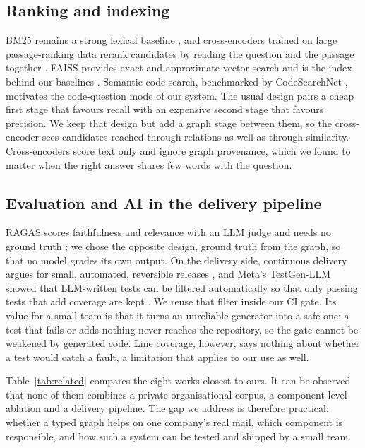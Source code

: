 \documentclass[12pt,onecolumn,draftclsnofoot]{IEEEtran}
\begin{document}
\subsection{Ranking and indexing}
BM25 remains a strong lexical baseline \cite{robertson2009bm25}, and cross-encoders trained on large passage-ranking data rerank candidates by reading the question and the passage together \cite{nogueira2019rerank}. FAISS provides exact and approximate vector search and is the index behind our baselines \cite{johnson2017faiss}. Semantic code search, benchmarked by CodeSearchNet \cite{husain2019codesearchnet}, motivates the code-question mode of our system. The usual design pairs a cheap first stage that favours recall with an expensive second stage that favours precision. We keep that design but add a graph stage between them, so the cross-encoder sees candidates reached through relations as well as through similarity. Cross-encoders score text only and ignore graph provenance, which we found to matter when the right answer shares few words with the question.

\subsection{Evaluation and AI in the delivery pipeline}
RAGAS scores faithfulness and relevance with an LLM judge and needs no ground truth \cite{es2023ragas}; we chose the opposite design, ground truth from the graph, so that no model grades its own output. On the delivery side, continuous delivery argues for small, automated, reversible releases \cite{humble2010cd}, and Meta's TestGen-LLM showed that LLM-written tests can be filtered automatically so that only passing tests that add coverage are kept \cite{alshahwan2024testgen}. We reuse that filter inside our CI gate. Its value for a small team is that it turns an unreliable generator into a safe one: a test that fails or adds nothing never reaches the repository, so the gate cannot be weakened by generated code. Line coverage, however, says nothing about whether a test would catch a fault, a limitation that applies to our use as well.

Table~\ref{tab:related} compares the eight works closest to ours. It can be observed that none of them combines a private organisational corpus, a component-level ablation and a delivery pipeline. The gap we address is therefore practical: whether a typed graph helps on one company's real mail, which component is responsible, and how such a system can be tested and shipped by a small team.
\end{document}
